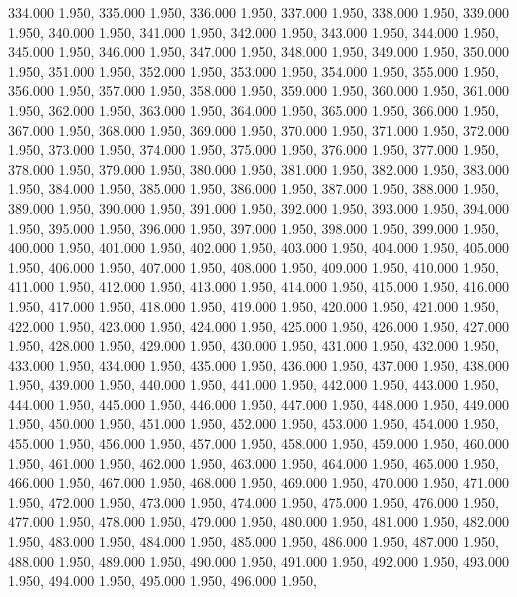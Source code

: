 334.000 1.950, 
335.000 1.950, 
336.000 1.950, 
337.000 1.950, 
338.000 1.950, 
339.000 1.950, 
340.000 1.950, 
341.000 1.950, 
342.000 1.950, 
343.000 1.950, 
344.000 1.950, 
345.000 1.950, 
346.000 1.950, 
347.000 1.950, 
348.000 1.950, 
349.000 1.950, 
350.000 1.950, 
351.000 1.950, 
352.000 1.950, 
353.000 1.950, 
354.000 1.950, 
355.000 1.950, 
356.000 1.950, 
357.000 1.950, 
358.000 1.950, 
359.000 1.950, 
360.000 1.950, 
361.000 1.950, 
362.000 1.950, 
363.000 1.950, 
364.000 1.950, 
365.000 1.950, 
366.000 1.950, 
367.000 1.950, 
368.000 1.950, 
369.000 1.950, 
370.000 1.950, 
371.000 1.950, 
372.000 1.950, 
373.000 1.950, 
374.000 1.950, 
375.000 1.950, 
376.000 1.950, 
377.000 1.950, 
378.000 1.950, 
379.000 1.950, 
380.000 1.950, 
381.000 1.950, 
382.000 1.950, 
383.000 1.950, 
384.000 1.950, 
385.000 1.950, 
386.000 1.950, 
387.000 1.950, 
388.000 1.950, 
389.000 1.950, 
390.000 1.950, 
391.000 1.950, 
392.000 1.950, 
393.000 1.950, 
394.000 1.950, 
395.000 1.950, 
396.000 1.950, 
397.000 1.950, 
398.000 1.950, 
399.000 1.950, 
400.000 1.950, 
401.000 1.950, 
402.000 1.950, 
403.000 1.950, 
404.000 1.950, 
405.000 1.950, 
406.000 1.950, 
407.000 1.950, 
408.000 1.950, 
409.000 1.950, 
410.000 1.950, 
411.000 1.950, 
412.000 1.950, 
413.000 1.950, 
414.000 1.950, 
415.000 1.950, 
416.000 1.950, 
417.000 1.950, 
418.000 1.950, 
419.000 1.950, 
420.000 1.950, 
421.000 1.950, 
422.000 1.950, 
423.000 1.950, 
424.000 1.950, 
425.000 1.950, 
426.000 1.950, 
427.000 1.950, 
428.000 1.950, 
429.000 1.950, 
430.000 1.950, 
431.000 1.950, 
432.000 1.950, 
433.000 1.950, 
434.000 1.950, 
435.000 1.950, 
436.000 1.950, 
437.000 1.950, 
438.000 1.950, 
439.000 1.950, 
440.000 1.950, 
441.000 1.950, 
442.000 1.950, 
443.000 1.950, 
444.000 1.950, 
445.000 1.950, 
446.000 1.950, 
447.000 1.950, 
448.000 1.950, 
449.000 1.950, 
450.000 1.950, 
451.000 1.950, 
452.000 1.950, 
453.000 1.950, 
454.000 1.950, 
455.000 1.950, 
456.000 1.950, 
457.000 1.950, 
458.000 1.950, 
459.000 1.950, 
460.000 1.950, 
461.000 1.950, 
462.000 1.950, 
463.000 1.950, 
464.000 1.950, 
465.000 1.950, 
466.000 1.950, 
467.000 1.950, 
468.000 1.950, 
469.000 1.950, 
470.000 1.950, 
471.000 1.950, 
472.000 1.950, 
473.000 1.950, 
474.000 1.950, 
475.000 1.950, 
476.000 1.950, 
477.000 1.950, 
478.000 1.950, 
479.000 1.950, 
480.000 1.950, 
481.000 1.950, 
482.000 1.950, 
483.000 1.950, 
484.000 1.950, 
485.000 1.950, 
486.000 1.950, 
487.000 1.950, 
488.000 1.950, 
489.000 1.950, 
490.000 1.950, 
491.000 1.950, 
492.000 1.950, 
493.000 1.950, 
494.000 1.950, 
495.000 1.950, 
496.000 1.950, 

